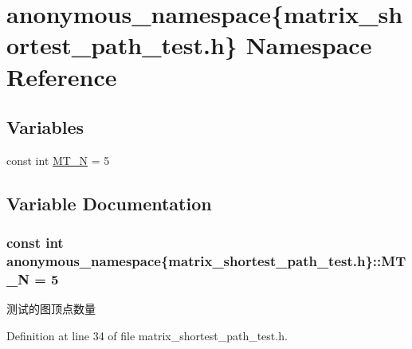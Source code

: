 \hypertarget{namespaceanonymous__namespace_02matrix__shortest__path__test_8h_03}{}\section{anonymous\+\_\+namespace\{matrix\+\_\+shortest\+\_\+path\+\_\+test.\+h\} Namespace Reference}
\label{namespaceanonymous__namespace_02matrix__shortest__path__test_8h_03}
\subsection*{Variables}
\begin{DoxyCompactItemize}
\item 
const int \hyperlink{namespaceanonymous__namespace_02matrix__shortest__path__test_8h_03_a096f90a47bd823d2dac8e4e35b2e7eed}{M\+T\+\_\+\+N} = 5
\end{DoxyCompactItemize}


\subsection{Variable Documentation}
\hypertarget{namespaceanonymous__namespace_02matrix__shortest__path__test_8h_03_a096f90a47bd823d2dac8e4e35b2e7eed}{}
\subsubsection[{M\+T\+\_\+\+N}]{\setlength{\rightskip}{0pt plus 5cm}const int anonymous\+\_\+namespace\{matrix\+\_\+shortest\+\_\+path\+\_\+test.\+h\}\+::M\+T\+\_\+\+N = 5}\label{namespaceanonymous__namespace_02matrix__shortest__path__test_8h_03_a096f90a47bd823d2dac8e4e35b2e7eed}
测试的图顶点数量 

Definition at line 34 of file matrix\+\_\+shortest\+\_\+path\+\_\+test.\+h.

